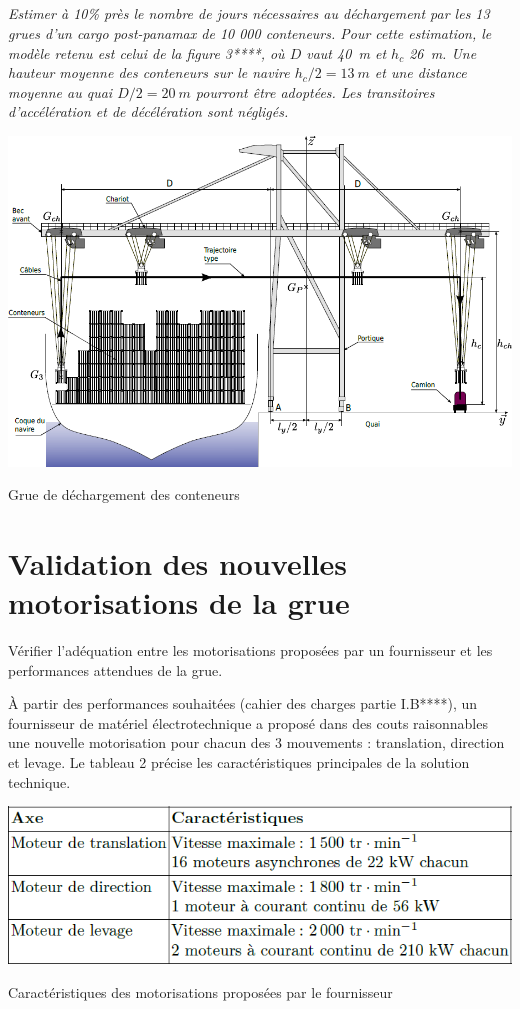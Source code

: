 \documentclass[10pt,fleqn]{article} %
\begin{document}
\subparagraph{\label{q01}}\textit{Estimer à 10\% près le nombre de jours nécessaires au déchargement par les 13 grues d’un cargo
post-panamax de 10 000 conteneurs. Pour cette estimation, le modèle retenu est celui de la figure 3****, où $D$ vaut
\SI{40}{m} et $h_c$ \SI{26}{m}. Une hauteur moyenne des conteneurs sur le navire $h_c/2 = \SI{13}{m}$ et une distance moyenne au
quai $D/2 = \SI{20}{m}$ pourront être adoptées. Les transitoires d’accélération et de décélération sont négligés.}


\begin{table}[H]
\centering
\includegraphics[width=.8\linewidth]{images/fig_03}
\caption{Grue de déchargement des conteneurs \label{fig_03}}
\end{table}

\section{Validation des nouvelles motorisations de la grue}
\begin{obj}
Vérifier l’adéquation entre les motorisations proposées par un fournisseur et les performances attendues
de la grue.
\end{obj}

À partir des performances souhaitées (cahier des charges partie I.B****), un fournisseur de matériel électrotechnique
a proposé dans des couts raisonnables une nouvelle motorisation pour chacun des 3 mouvements : translation,
direction et levage. Le tableau 2 précise les caractéristiques principales de la solution technique.

\begin{table}[H]
\centering
\includegraphics[width=.48\linewidth]{images/tab_02}
\caption{Caractéristiques des motorisations proposées par le fournisseur \label{tab_02}}
\end{table}
\end{document}
